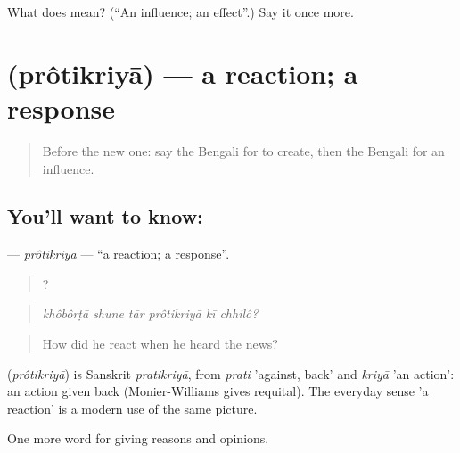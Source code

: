 \begin{tcolorbox}[breakable,colback=teal!4,colframe=teal!35!black,title={Before you move on}]
What does  mean? (\textquotedblleft{}An influence; an effect\textquotedblright{}.) Say it once more.
\end{tcolorbox}
\section[\texorpdfstring{\bn{প্রতিক্রিয়া} (prôtikriyā)}{প্রতিক্রিয়া (prôtikriyā)}]{ (prôtikriyā) — a reaction; a response}

\label{lesson:BN-C330-protikriya}



\begin{quote}
Before the new one: say the Bengali for to create, then the Bengali for an influence.
\end{quote}

\subsection*{You'll want to know: }
\textbf{} — \emph{prôtikriyā} — \textquotedblleft{}a reaction; a response\textquotedblright{}.

\begin{quote}
     ?
\end{quote}

\begin{quote}
\emph{khôbôrṭā shune tār prôtikriyā kī chhilô?}
\end{quote}

\begin{quote}
How did he react when he heard the news?
\end{quote}

\begin{cousinweb}
\textbf{} (\emph{prôtikriyā}) is Sanskrit \emph{pratikriyā}, from \emph{prati} 'against, back' and \emph{kriyā} 'an action': an action given back (Monier-Williams gives requital). The everyday sense 'a reaction' is a modern use of the same picture.
\end{cousinweb}

\begin{grammarlens}[title={What you've built}]
One more word for giving reasons and opinions.
\end{grammarlens}


